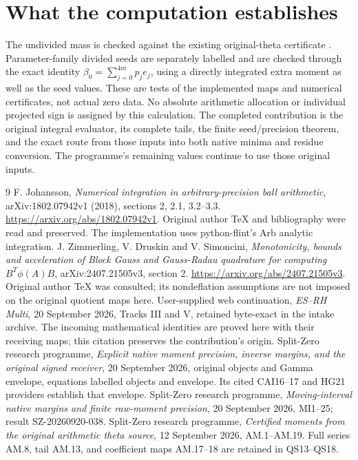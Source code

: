\documentclass[11pt]{article}
\begin{document}
\section{What the computation establishes}
The undivided mass is checked against the existing original-theta
certificate \cite{AM}. Parameter-family divided seeds are separately
labelled and are checked through the exact identity
\(\beta_0=\sum_{j=0}^{4m}p_je_j\), using a directly integrated extra
moment as well as the seed values. These are tests of the implemented
maps and numerical certificates, not actual zero data.
No absolute arithmetic allocation or individual projected sign is
assigned by this calculation.
The completed contribution is the original integral evaluator,
its complete tails, the finite seed/precision theorem, and the exact
route from those inputs into both native minima and residue conversion.
The programme's remaining values continue to use those original inputs.

\begin{thebibliography}{9}
 F. Johansson, \emph{Numerical integration in
arbitrary-precision ball arithmetic}, arXiv:1802.07942v1 (2018),
sections 2, 2.1, 3.2--3.3.
\url{https://arxiv.org/abs/1802.07942v1}.
Original author TeX and bibliography were read and preserved.
The implementation uses python-flint's Arb analytic integration.
 J. Zimmerling, V. Druskin and V. Simoncini,
\emph{Monotonicity, bounds and acceleration of Block Gauss and
Gauss-Radau quadrature for computing \(B^T\phi(A)B\)},
arXiv:2407.21505v3, section 2.
\url{https://arxiv.org/abs/2407.21505v3}.
Original author TeX was consulted; its nondeflation assumptions
are not imposed on the original quotient maps here.
 User-supplied web continuation,
\emph{ES--RH Multi}, 20 September 2026,
Tracks III and V, retained byte-exact in the intake archive.
The incoming mathematical identities are proved here with their
receiving maps; this citation preserves the contribution's origin.
 Split-Zero research programme,
\emph{Explicit native moment precision, inverse margins, and the
original signed receiver}, 20 September 2026, original objects and
Gamma envelope, equations labelled objects and envelope.
Its cited CAI16--17 and HG21 providers establish that envelope.
 Split-Zero research programme,
\emph{Moving-interval native margins and finite raw-moment precision},
20 September 2026, MI1--25; result SZ-20260920-038.
 Split-Zero research programme,
\emph{Certified moments from the original arithmetic theta source},
12 September 2026, AM.1--AM.19. Full series AM.8, tail AM.13,
and coefficient maps AM.17--18 are retained in QS13--QS18.
\end{thebibliography}
\end{document}
